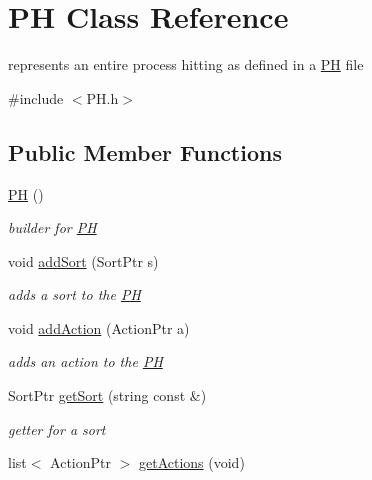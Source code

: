 \hypertarget{class_p_h}{\section{\-P\-H \-Class \-Reference}
\label{class_p_h}
}


represents an entire process hitting as defined in a \hyperlink{class_p_h}{\-P\-H} file  




{\ttfamily \#include $<$\-P\-H.\-h$>$}

\subsection*{\-Public \-Member \-Functions}
\begin{DoxyCompactItemize}
\item 
\hypertarget{class_p_h_ae3ab2dd87b4bfadf04c1a14c6091aebc}{\hyperlink{class_p_h_ae3ab2dd87b4bfadf04c1a14c6091aebc}{\-P\-H} ()}\label{class_p_h_ae3ab2dd87b4bfadf04c1a14c6091aebc}

\begin{DoxyCompactList}\small\item\em builder for \hyperlink{class_p_h}{\-P\-H} \end{DoxyCompactList}\item 
void \hyperlink{class_p_h_ad4335e01899c57e6802021f1afb83e7f}{add\-Sort} (\-Sort\-Ptr s)
\begin{DoxyCompactList}\small\item\em adds a sort to the \hyperlink{class_p_h}{\-P\-H} \end{DoxyCompactList}\item 
void \hyperlink{class_p_h_ae9bed9356d272f3c43f2147d6d8e5906}{add\-Action} (\-Action\-Ptr a)
\begin{DoxyCompactList}\small\item\em adds an action to the \hyperlink{class_p_h}{\-P\-H} \end{DoxyCompactList}\item 
\hypertarget{class_p_h_a02f1cd90c270555a50c08caa0fb2d491}{\-Sort\-Ptr \hyperlink{class_p_h_a02f1cd90c270555a50c08caa0fb2d491}{get\-Sort} (string const \&)}\label{class_p_h_a02f1cd90c270555a50c08caa0fb2d491}

\begin{DoxyCompactList}\small\item\em getter for a sort \end{DoxyCompactList}\item 
\hypertarget{class_p_h_ae9861660fe017ab285451b2ac8e191a4}{list$<$ \-Action\-Ptr $>$ \hyperlink{class_p_h_ae9861660fe017ab285451b2ac8e191a4}{get\-Actions} (void)}\label{class_p_h_ae9861660fe017ab285451b2ac8e191a4}


\end{DoxyCompactItemize}
